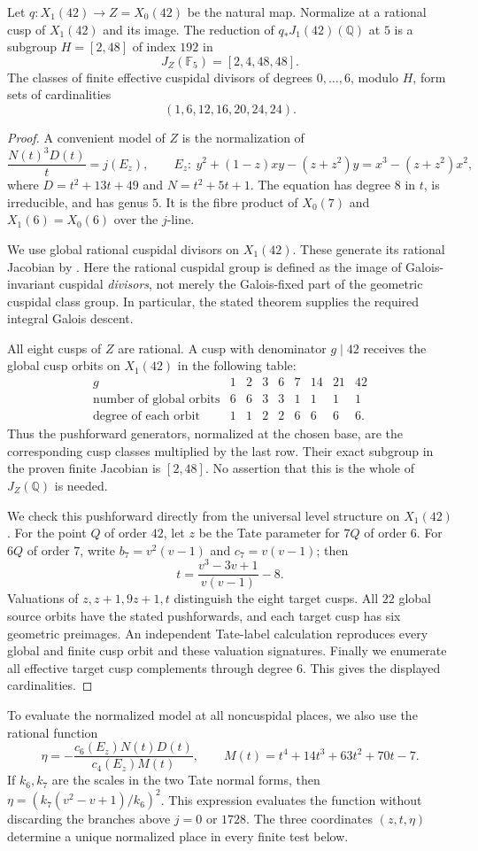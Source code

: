\begin{lemma}\label{lem:decic242-X042-image}
Let $q:X_1(42)\to Z=X_0(42)$ be the natural map.
Normalize at a rational cusp of $X_1(42)$ and its image.
The reduction of $q_*J_1(42)(\mathbb Q)$ at $5$ is a subgroup
$H=[2,48]$ of index $192$ in
\[
 J_Z(\mathbb F_5)=[2,4,48,48].
\]
The classes of finite effective cuspidal divisors of degrees
$0,\ldots,6$, modulo $H$, form sets of cardinalities
\[
 (1,6,12,16,20,24,24).
\]
\end{lemma}
\begin{proof}
A convenient model of $Z$ is the normalization of
\[
 \frac{N(t)^3D(t)}t=j(E_z),\qquad
 E_z:\ y^2+(1-z)xy-(z+z^2)y=x^3-(z+z^2)x^2,
\]
where $D=t^2+13t+49$ and $N=t^2+5t+1$.
The equation has degree $8$ in $t$, is irreducible, and has genus
$5$. It is the fibre product of $X_0(7)$ and
$X_1(6)=X_0(6)$ over the $j$-line.

We use global rational cuspidal divisors on $X_1(42)$.
These generate its rational Jacobian by
\cite[Theorems~3.1 and 4.13, and Table~2]{DEHMZ}.
Here the rational cuspidal group is defined as the image of
Galois-invariant cuspidal \emph{divisors}, not merely the
Galois-fixed part of the geometric cuspidal class group.
In particular, the stated theorem supplies the required integral
Galois descent.

All eight cusps of $Z$ are rational.
A cusp with denominator $g\mid42$ receives the global cusp
orbits on $X_1(42)$ in the following table:
\[
\begin{array}{c|rrrrrrrr}
g&1&2&3&6&7&14&21&42\\\hline
\text{number of global orbits}&6&6&3&3&1&1&1&1\\
\text{degree of each orbit}&1&1&2&2&6&6&6&6.
\end{array}
\]
Thus the pushforward generators, normalized at the chosen base,
are the corresponding cusp classes multiplied by the last row.
Their exact subgroup in the proven finite Jacobian is $[2,48]$.
No assertion that this is the whole of $J_Z(\mathbb Q)$ is needed.

We check this pushforward directly from the universal level
structure on $X_1(42)$.
For the point $Q$ of order $42$, let $z$ be the Tate parameter
for $7Q$ of order $6$.
For $6Q$ of order $7$, write
$b_7=v^2(v-1)$ and $c_7=v(v-1)$; then
\[
 t=\frac{v^3-3v+1}{v(v-1)}-8.
\]
Valuations of $z,z+1,9z+1,t$ distinguish the eight target cusps.
All $22$ global source orbits have the stated pushforwards, and
each target cusp has six geometric preimages.
An independent Tate-label calculation reproduces every global
and finite cusp orbit and these valuation signatures.
Finally we enumerate all effective target cusp complements
through degree $6$. This gives the displayed cardinalities.
\end{proof}

\noindent
To evaluate the normalized model at all noncuspidal places, we
also use the rational function
\[
 \eta=-\frac{c_6(E_z)N(t)D(t)}{c_4(E_z)M(t)},\qquad
 M(t)=t^4+14t^3+63t^2+70t-7.
\]
If $k_6,k_7$ are the scales in the two Tate normal forms, then
$\eta=(k_7(v^2-v+1)/k_6)^2$.
This expression evaluates the function without discarding the
branches above $j=0$ or $1728$.
The three coordinates $(z,t,\eta)$ determine a unique normalized
place in every finite test below.
